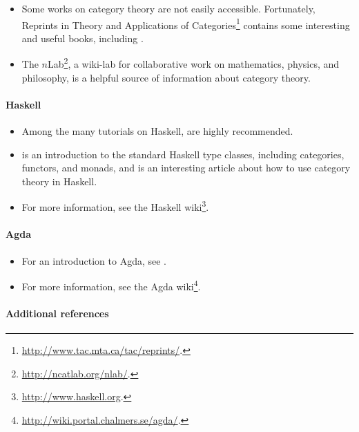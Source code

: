 \begin{itemize}
\item
  Some works on category theory are not easily accessible.
  Fortunately, Reprints in Theory and Applications of
  Categories\footnote{\url{http://www.tac.mta.ca/tac/reprints/}.}
  contains some interesting and useful books, including
  \parencites{adamek-et-al-2006}{barr-wells-2005}{barr-wells-2012}.

\item
  The $n$Lab\footnote{\url{http://ncatlab.org/nlab/}.}, a wiki-lab for
  collaborative work on mathematics, physics, and philosophy, is a
  helpful source of information about category theory.

\end{itemize}

\paragraph{Haskell}

\begin{itemize}
\item
  Among the many tutorials on Haskell,
  \parencites{lipovaca-2011}{osullivan-et-al-2008} are highly
  recommended.

\item
  \textcite{yorgey-2009} is an introduction to the standard Haskell
  type classes, including categories, functors, and monads, and
  \parencite{elkins-2009} is an interesting article about how to use
  category theory in Haskell.

\item
  For more information, see the Haskell
  wiki\footnote{\url{http://www.haskell.org}.}.

\end{itemize}

\paragraph{Agda}

\begin{itemize}
\item
  For an introduction to Agda, see
  \parencites{bove-dybjer-2009}{norell-2009}.

\item
  For more information, see the Agda
  wiki\footnote{\url{http://wiki.portal.chalmers.se/agda/}.}.

\end{itemize}

\paragraph{Additional references}

